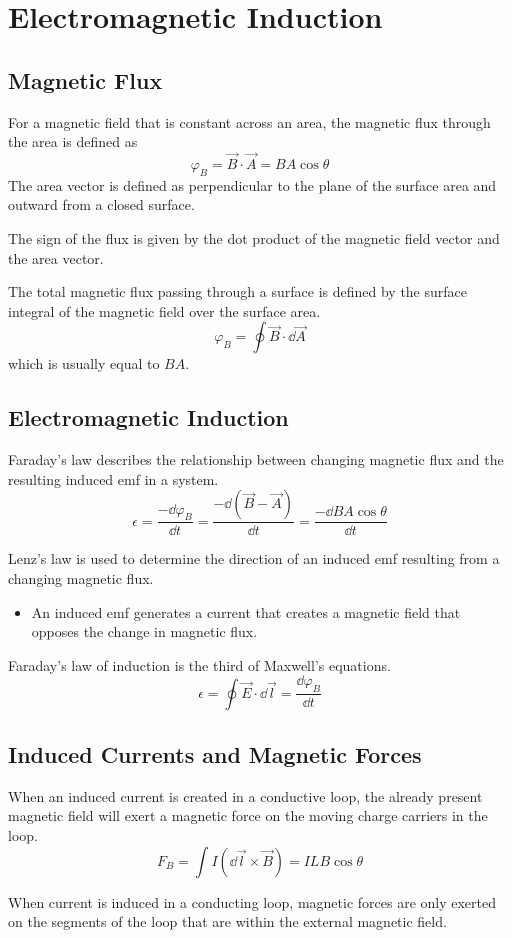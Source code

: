 \documentclass[../em.tex]{subfiles}
\begin{document}
\chapter{Electromagnetic Induction}
\section{Magnetic Flux}
For a magnetic field that is constant across an area, the magnetic flux through the area is defined as 
\[ \varphi_B = \vec{B}\cdot\vec{A}=BA\cos\theta \]
The area vector is defined as perpendicular to the plane of the surface area and outward from a closed surface.

The sign of the flux is given by the dot product of the magnetic field vector and the area vector.

The total magnetic flux passing through a surface is defined by the surface integral of the magnetic field over the surface area.
\[\varphi_B = \oint \vec{B}\cdot\dd\vec{A} \]
which is usually equal to $BA$.
\section{Electromagnetic Induction}
Faraday's law describes the relationship between changing magnetic flux and the resulting induced emf in a system.
\[\epsilon = \frac{-\dd\varphi_B}{\dd t} = \frac{-\dd(\vec{B}-\vec{A})}{\dd t} = \frac{-\dd BA\cos\theta}{\dd t}\]

Lenz's law is used to determine the direction of an induced emf resulting from a changing magnetic flux.
\begin{itemize}
    \item An induced emf generates a current that creates a magnetic field that opposes the change in magnetic flux.
\end{itemize}

Faraday's law of induction is the third of Maxwell's equations.
\[ \epsilon = \oint \vec{E}\cdot\dd \vec{l} = \frac{\dd \varphi_B}{\dd t}\]

\section{Induced Currents and Magnetic Forces}
When an induced current is created in a conductive loop, the already present magnetic field will exert a magnetic force on the moving charge carriers in the loop.
\[ F_B = \int I(\dd \vec{l}\times \vec{B}) = ILB\cos\theta \]

When current is induced in a conducting loop, magnetic forces are only exerted on the segments of the loop that are within the external magnetic field.
\end{document}
